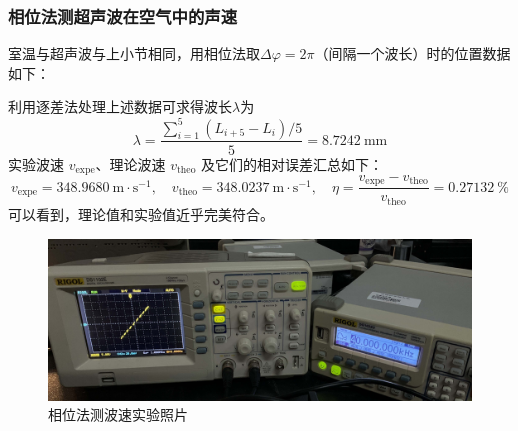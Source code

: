 \documentclass[UTF8]{article}
\theoremstyle{MyLineTheoremStyle} %
\theoremstyle{MyBlockTheoremStyle} %
\theoremstyle{MySubsubsectionStyle} %
\begin{document}
\subsubsection{相位法测超声波在空气中的声速}
室温与超声波与上小节相同，用相位法取$ \Delta\varphi=2\pi $（间隔一个波长）时的位置数据如下：
\begin{table}[H]\centering
    \caption{相位法求空气中声波波速}
    \label{相位法求空气中声波波速}
\end{table}

利用逐差法处理上述数据可求得波长$ \lambda $为
\begin{equation}
\lambda=\frac{\sum_{i=1}^{5}(L_{i+5}-L_i)/5}{5}= 8.7242 \ \mathrm{mm}
\end{equation}
实验波速 $v_{\text{expe}}$、理论波速 $v_{\text{theo}}$ 及它们的相对误差汇总如下：
\begin{equation}
    v_{\text{expe}} = 348.9680 \ \mathrm{m \cdot s^{-1}},\quad 
    v_{\text{theo}} = 348.0237 \ \mathrm{m \cdot s^{-1}},\quad 
    \eta = \frac{v_{\text{expe}} - v_{\text{theo}}}{v_{\text{theo}}} = 0.27132\ \%
\end{equation}
可以看到，理论值和实验值近乎完美符合。
\begin{figure}[H]\centering
    \includegraphics[width=0.75\columnwidth]{assets/相位法.jpg}
    \caption{相位法测波速实验照片}
\end{figure}
\end{document}
